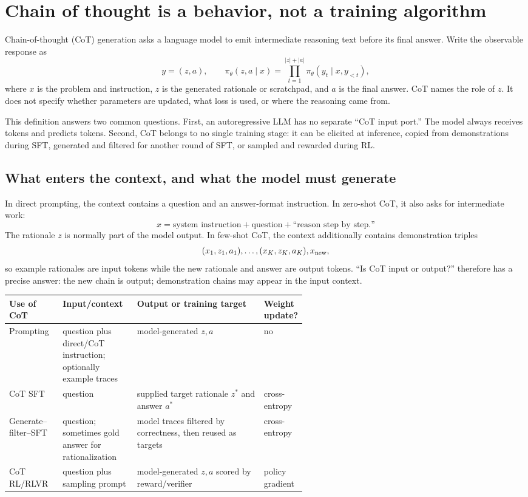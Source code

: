 \documentclass[11pt]{article}
\begin{document}
\section{Chain of thought is a behavior, not a training algorithm}

Chain-of-thought (CoT) generation asks a language model to emit intermediate
reasoning text before its final answer.  Write the observable response as
\[
y=(z,a),\qquad
\pi_\theta(z,a\mid x)
=\prod_{t=1}^{|z|+|a|}\pi_\theta(y_t\mid x,y_{<t}),
\]
where $x$ is the problem and instruction, $z$ is the generated rationale or
scratchpad, and $a$ is the final answer.  CoT names the role of $z$.  It does
not specify whether parameters are updated, what loss is used, or where the
reasoning came from.

This definition answers two common questions.  First, an autoregressive LLM has
no separate ``CoT input port.''  The model always receives tokens and predicts
tokens.  Second, CoT belongs to no single training stage: it can be elicited at
inference, copied from demonstrations during SFT, generated and filtered for
another round of SFT, or sampled and rewarded during RL.

\subsection{What enters the context, and what the model must generate}

In direct prompting, the context contains a question and an answer-format
instruction.  In zero-shot CoT, it also asks for intermediate work:
\[
x=\text{system instruction}+\text{question}+\text{``reason step by step.''}
\]
The rationale $z$ is normally part of the model output.  In few-shot CoT, the
context additionally contains demonstration triples
\[
(x_1,z_1,a_1),\ldots,(x_K,z_K,a_K),x_{\rm new},
\]
so example rationales are input tokens while the new rationale and answer are
output tokens.  ``Is CoT input or output?'' therefore has a precise answer:
the new chain is output; demonstration chains may appear in the input context.

\begin{center}\small
\begin{tabularx}{\linewidth}{p{0.18\linewidth}p{0.25\linewidth}X p{0.14\linewidth}}
\toprule
Use of CoT & Input/context & Output or training target & Weight update? \\
\midrule
Prompting & question plus direct/CoT instruction; optionally example traces & model-generated $z,a$ & no \\
CoT SFT & question & supplied target rationale $z^*$ and answer $a^*$ & cross-entropy \\
Generate--filter--SFT & question; sometimes gold answer for rationalization & model traces filtered by correctness, then reused as targets & cross-entropy \\
CoT RL/RLVR & question plus sampling prompt & model-generated $z,a$ scored by reward/verifier & policy gradient \\
\bottomrule
\end{tabularx}
\end{center}
\end{document}
